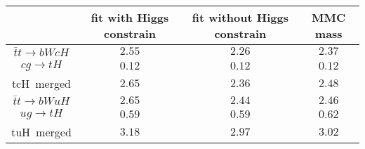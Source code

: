 
\centering
\begin{tabular}{cccc} \toprule\toprule
& fit with Higgs constrain  & fit without Higgs constrain & MMC mass\\\midrule
$\bar{t}t\to bWcH$ &    $2.55$  & $2.26$  & $2.37$       \\
$cg\to tH$ &            $0.12$  & $0.12$  & $0.12$       \\
tcH~merged &            $2.65$  & $2.36$  & $2.48$        \\
$\bar{t}t\to bWuH$ &    $2.65$  & $2.44$  & $2.46$         \\
$ug\to tH$ &            $0.59$  & $0.59$  & $0.62$         \\
tuH~merged &            $3.18$  & $2.97$  & $3.02$         \\
\bottomrule\bottomrule                  
\end{tabular}
